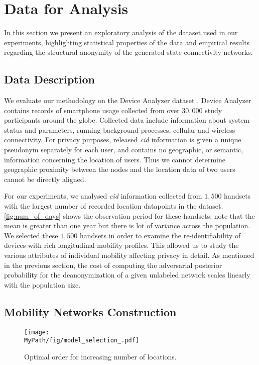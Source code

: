 \section{Data for Analysis}

In this section we present an exploratory analysis of the dataset used in our experiments, highlighting statistical properties of the data and empirical results regarding the structural anonymity of the generated state connectivity networks.

\subsection{Data Description}

We evaluate our methodology on the Device Analyzer dataset \cite{Wagner2014}. Device Analyzer contains records of smartphone usage collected from over $ 30,000 $  study participants around the globe.
Collected data include information about system status and parameters, running background processes, cellular and wireless connectivity.
For privacy purposes, released \emph{cid} information is given a unique pseudonym separately for each user, and contains no geographic, or semantic, information concerning the location of users.
Thus we cannot determine geographic proximity between the nodes and the location data of two users cannot be directly aligned.

For our experiments, we analysed \emph{cid} information collected from $1,500$ handsets with the largest number of recorded location datapoints in the dataset.
\cref{fig:num_of_days} shows the observation period for these handsets; note that the mean is greater than one year but there is lot of variance across the population.
We selected these $1,500$ handsets in order to examine the re-identifiability of devices with rich longitudinal mobility profiles.
This allowed us to study the various attributes of individual mobility affecting privacy in detail.
As mentioned in the previous section, the cost of computing the adversarial posterior probability for the deanonymization of a given unlabeled network scales linearly with the population size.

\subsection{Mobility Networks Construction\label{sec:mobility-net-construct}}

\begin{figure*}[t]
	\centering
	\texttt{[image: \\MyPath/fig/model\_selection\_.pdf]}
	\caption{{Optimal order for increasing number of locations.}}
	\label{fig:model_selection}
\end{figure*}

